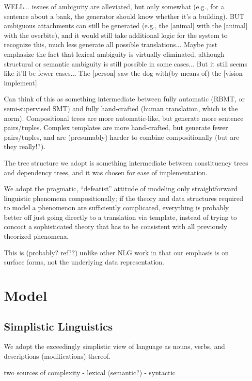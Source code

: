 WELL... issues of ambiguity are alleviated, but only somewhat (e.g., for a sentence about a bank, the generator should know whether it's a building). 
BUT ambiguous attachments can still be generated (e.g., the [animal] with the [animal] with the overbite), and it would still take additional logic for the system to recognize this, much less generate all possible translations...
Maybe just emphasize the fact that lexical ambiguity is virtually eliminated, although structural or semantic ambiguity is still possible in some cases...
But it still seems like it'll be fewer cases... The [person] saw the dog with(by means of) the [vision implement]


Can think of this as something intermediate between fully automatic (RBMT, or semi-supervised SMT) and fully hand-crafted (human translation, which is the norm).
Compositional trees are more automatic-like, but generate more sentence pairs/tuples.
Complex templates are more hand-crafted, but generate fewer pairs/tuples, and are (presumably) harder to combine compositionally (but are they really!?).

The tree structure we adopt is something intermediate between constituency trees and dependency trees, and it was chosen for ease of implementation.

We adopt the pragmatic, ``defeatist'' attitude of modeling only straightforward linguistic phenomena compositionally; if the theory and data structures required to model a phenomenon are sufficiently complicated, everything is probably better off just going directly to a translation via template, instead of trying to concoct a sophisticated theory that has to be consistent with all previously theorized phenomena.

This is (probably? ref??) unlike other NLG work in that our emphasis is on surface forms, not the underlying data representation.


\section{Model}

\subsection{Simplistic Linguistics}
We adopt the exceedingly simplistic view of language as nouns, verbs, and descriptions (modifications) thereof.

two sources of complexity
- lexical (semantic?)
- syntactic 

